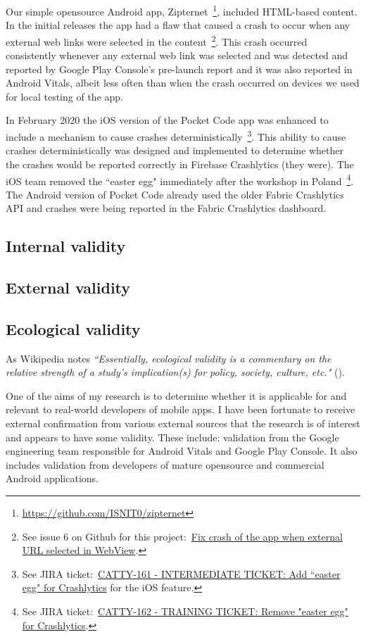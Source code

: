 Our simple opensource Android app, Zipternet~\footnote{\url{https://github.com/ISNIT0/zipternet}}, included HTML-based content. In the initial releases the app had a flaw that caused a crash to occur when any external web links were selected in the content~\footnote{See issue 6 on Github for this project:~\href{https://github.com/ISNIT0/zipternet/issues/6}{Fix crash of the app when external URL selected in WebView}.}. This crash occurred consistently whenever any external web link was selected and was detected and reported by Google Play Console's pre-launch report and it was also reported in Android Vitals, albeit less often than when the crash occurred on devices we used for local testing of the app.


In February 2020 the iOS version of the Pocket Code app was enhanced to include a mechanism to cause crashes deterministically~\footnote{See JIRA ticket:~\href{https://jira.catrob.at/browse/CATTY-161}{CATTY-161 - INTERMEDIATE TICKET: Add ``easter egg" for Crashlytics} for the iOS feature.}. This ability to cause crashes deterministically was designed and implemented to determine whether the crashes would be reported correctly in Firebase Crashlytics (they were). The iOS team removed the ``easter egg" immediately after the workshop in Poland~\footnote{See JIRA ticket:~\href{https://jira.catrob.at/browse/CATTY-162}{CATTY-162 - TRAINING TICKET: Remove "easter egg" for Crashlytics}.}. The Android version of Pocket Code already used the older Fabric Crashlytics API and crashes were being reported in the Fabric Crashlytics dashboard.

\subsection{Internal validity}

\subsection{External validity}

\subsection{Ecological validity}
As Wikipedia notes \emph{``Essentially, ecological validity is a commentary on the relative strength of a study's implication(s) for policy, society, culture, etc."} (\cite{wikipedia_ecological_validity}).

One of the aims of my research is to determine whether it is applicable for and relevant to real-world developers of mobile apps. 
I have been fortunate to receive external confirmation from various external sources that the research is of interest and appears to have some validity. These include: validation from the Google engineering team responsible for Android Vitals and Google Play Console. It also includes validation from developers of mature opensource and commercial Android applications. 

